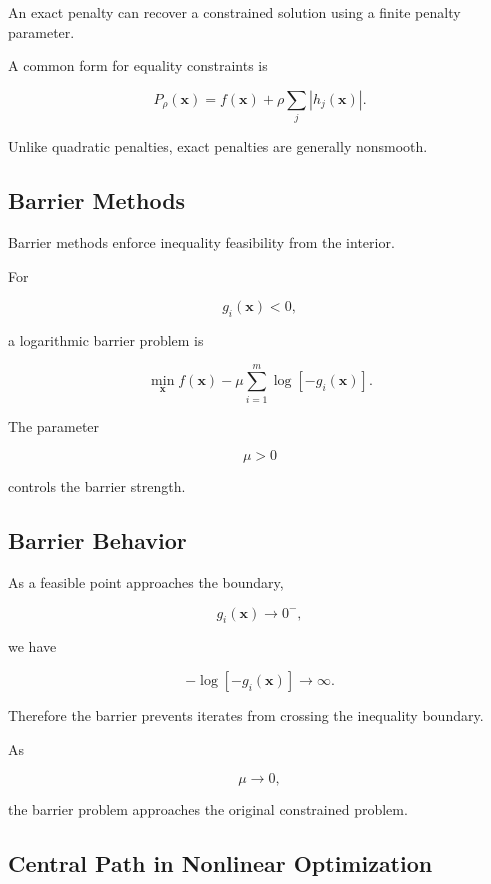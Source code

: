 An exact penalty can recover a constrained solution using a finite
penalty parameter.

A common form for equality constraints is

\[
\boxed{
P_\rho(\mathbf{x})
=
f(\mathbf{x})
+
\rho
\sum_j
|h_j(\mathbf{x})|.
}
\]

Unlike quadratic penalties, exact penalties are generally nonsmooth.

\subsection{Barrier Methods}
\label{subsec:nlp-barrier-methods}

Barrier methods enforce inequality feasibility from the interior.

For

\[
g_i(\mathbf{x})<0,
\]

a logarithmic barrier problem is

\[
\boxed{
\min_{\mathbf{x}}
f(\mathbf{x})
-
\mu
\sum_{i=1}^{m}
\log
[
-g_i(\mathbf{x})
].
}
\]

The parameter

\[
\mu>0
\]

controls the barrier strength.

\subsection{Barrier Behavior}
\label{subsec:nlp-barrier-behavior}

As a feasible point approaches the boundary,

\[
g_i(\mathbf{x})\to0^-,
\]

we have

\[
-\log[-g_i(\mathbf{x})]
\to\infty.
\]

Therefore the barrier prevents iterates from crossing the inequality
boundary.

As

\[
\mu\to0,
\]

the barrier problem approaches the original constrained problem.

\subsection{Central Path in Nonlinear Optimization}
\label{subsec:nlp-central-path}

